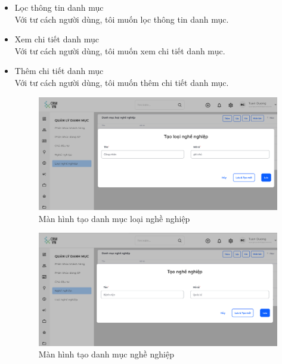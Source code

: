 \documentclass[12pt,a4paper]{article}
\begin{document}
\begin{enumerate}
\begin{itemize}
            \item Lọc thông tin danh mục \\
            Với tư cách người dùng, tôi muốn lọc thông tin danh mục.

            \item Xem chi tiết danh mục \\
            Với tư cách người dùng, tôi muốn xem chi tiết danh mục.

            \item Thêm chi tiết danh mục \\
            Với tư cách người dùng, tôi muốn thêm chi tiết danh mục.

            \begin{figure}[H]
                \centering \includegraphics[width=\textwidth]{Img/Nguyet/Danhmuc/dmnn.png}
                \vspace{0.5cm}
                \caption{Màn hình tạo danh mục loại nghề nghiệp}
                \label{taolnn}
            \end{figure}

            \begin{figure}[H]
                \centering \includegraphics[width=\textwidth]{Img/Nguyet/Danhmuc/taonghengiep.png}
                \vspace{0.5cm}
                \caption{Màn hình tạo danh mục nghề nghiệp}
                \label{taonn}
            \end{figure}


\end{itemize}
\end{enumerate}
\end{document}
